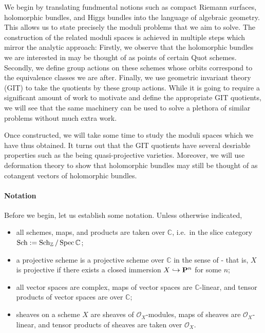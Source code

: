 \documentclass[12pt]{ociamthesis}  %
\begin{document}
We begin by translating fundmental notions such as compact
Riemann surfaces, holomorphic bundles, and Higgs bundles into
the language of algebraic geometry. This allows us to state
precisely the moduli problems that we aim to solve. The construction
of the related moduli spaces is achieved in multiple steps which
mirror the analytic approach: Firstly, we observe that the
holomorphic bundles we are interested in may be thought of as
points of certain Quot schemes. Secondly, we define group
actions on these schemes whose orbits correspond to the
equivalence classes we are after. Finally, we use geometric
invariant theory (GIT) to take the quotients by these group
actions. While it is going to require a significant amount of
work to motivate and define the appropriate GIT quotients,
we will see that the same machinery can be used to solve
a plethora of similar problems without much extra work.

Once constructed, we will take some time to study the moduli
spaces which we have thus obtained. It turns out that the GIT
quotients have several desriable properties such as the being
quasi-projective varieties. Moreover, we will use deformation
theory to show that holomorphic bundles may still be thought
of as cotangent vectors of holomorphic bundles.

\paragraph*{Notation}

Before we begin, let us establish some notation. Unless otherwise
indicated,
\begin{itemize}
  \item all schemes, maps, and products are taken over $\mathbb{C}$,
    i.e.~in the slice category
    $\operatorname{Sch} := \operatorname{Sch}_{\mathbb{Z}}/\operatorname{Spec}\mathbb{C}$;
  \item a projective scheme is a projective scheme over $\mathbb{C}$
    in the sense of \cite{hartshorne1977} - that is, $X$ is projective
    if there exists a closed immersion $X\hookrightarrow\mathbf{P}^{n}_{}$ for
    some $n$;
  \item all vector spaces are complex, maps of vector spaces are
    $\mathbb{C}$-linear, and tensor products of vector spaces are
    over $\mathbb{C}$;
  \item sheaves on a scheme $X$ are sheaves of $\mathcal O_X$-modules,
    maps of sheaves are $\mathcal O_X$-linear, and tensor products
    of sheaves are taken over $\mathcal O_X$.
\end{itemize}
\end{document}
